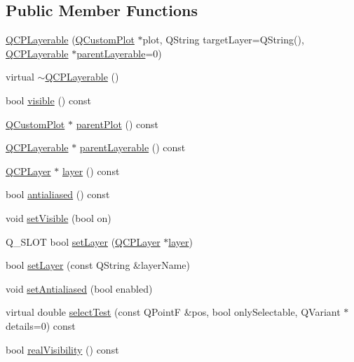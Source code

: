 \subsection*{Public Member Functions}
\begin{DoxyCompactItemize}
\item 
\hyperlink{class_q_c_p_layerable_a74c0fa237f29bf0e49565013fc5d1ec0}{Q\+C\+P\+Layerable} (\hyperlink{class_q_custom_plot}{Q\+Custom\+Plot} $\ast$plot, Q\+String target\+Layer=Q\+String(), \hyperlink{class_q_c_p_layerable}{Q\+C\+P\+Layerable} $\ast$\hyperlink{class_q_c_p_layerable_aa78b7e644d2c519e1a9a6f2ac5fcd858}{parent\+Layerable}=0)
\item 
virtual \hyperlink{class_q_c_p_layerable_a4231cf5b3601d6d3a5781283e7a9735b}{$\sim$\+Q\+C\+P\+Layerable} ()
\item 
bool \hyperlink{class_q_c_p_layerable_af0297b944b6192b6d67d00bff41b6b70}{visible} () const
\item 
\hyperlink{class_q_custom_plot}{Q\+Custom\+Plot} $\ast$ \hyperlink{class_q_c_p_layerable_a473edb813a4c1929d6b6a8fe3ff3faf7}{parent\+Plot} () const
\item 
\hyperlink{class_q_c_p_layerable}{Q\+C\+P\+Layerable} $\ast$ \hyperlink{class_q_c_p_layerable_aa78b7e644d2c519e1a9a6f2ac5fcd858}{parent\+Layerable} () const
\item 
\hyperlink{class_q_c_p_layer}{Q\+C\+P\+Layer} $\ast$ \hyperlink{class_q_c_p_layerable_a5ff4862e8c784c9f5986dbc1533ba2a4}{layer} () const
\item 
bool \hyperlink{class_q_c_p_layerable_a71cbd212fde2703cee076e204a475709}{antialiased} () const
\item 
void \hyperlink{class_q_c_p_layerable_a3bed99ddc396b48ce3ebfdc0418744f8}{set\+Visible} (bool on)
\item 
Q\+\_\+\+S\+L\+OT bool \hyperlink{class_q_c_p_layerable_ab0d0da6d2de45a118886d2c8e16d5a54}{set\+Layer} (\hyperlink{class_q_c_p_layer}{Q\+C\+P\+Layer} $\ast$\hyperlink{class_q_c_p_layerable_a5ff4862e8c784c9f5986dbc1533ba2a4}{layer})
\item 
bool \hyperlink{class_q_c_p_layerable_ab25a0e7b897993b44447caee0f142083}{set\+Layer} (const Q\+String \&layer\+Name)
\item 
void \hyperlink{class_q_c_p_layerable_a4fd43e89be4a553ead41652565ff0581}{set\+Antialiased} (bool enabled)
\item 
virtual double \hyperlink{class_q_c_p_layerable_a04db8351fefd44cfdb77958e75c6288e}{select\+Test} (const Q\+PointF \&pos, bool only\+Selectable, Q\+Variant $\ast$details=0) const
\item 
bool \hyperlink{class_q_c_p_layerable_ab054e88f15d485defcb95e7376f119e7}{real\+Visibility} () const
\end{DoxyCompactItemize}
